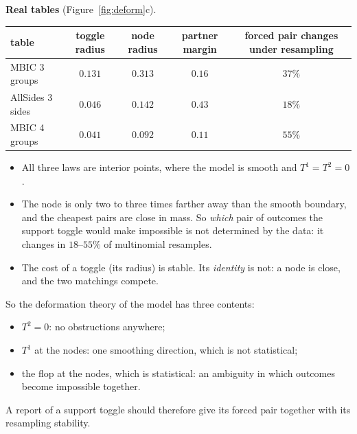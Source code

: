 \documentclass[11pt]{article}
\theoremstyle{definition}
\theoremstyle{remark}
\begin{document}
\textbf{Real tables} (Figure~\ref{fig:deform}c).
\begin{center}\small
\begin{tabular}{lcccc}
\toprule
table & toggle radius & node radius & partner margin & forced pair changes under resampling\\
\midrule
MBIC 3 groups & $0.131$ & $0.313$ & $0.16$ & $37\%$\\
AllSides 3 sides & $0.046$ & $0.142$ & $0.43$ & $18\%$\\
MBIC 4 groups & $0.041$ & $0.092$ & $0.11$ & $55\%$\\
\bottomrule
\end{tabular}
\end{center}
\begin{itemize}
  \item All three laws are interior points, where the model is smooth and $T^1=T^2=0$.
  \item The node is only two to three times farther away than the smooth boundary, and the cheapest pairs are close in mass. So \emph{which} pair of outcomes the support toggle would make impossible is not determined by the data: it changes in $18$--$55\%$ of multinomial resamples.
  \item The cost of a toggle (its radius) is stable. Its \emph{identity} is not: a node is close, and the two matchings compete.
\end{itemize}

\noindent So the deformation theory of the model has three contents:
\begin{itemize}
  \item $T^2=0$: no obstructions anywhere;
  \item $T^1$ at the nodes: one smoothing direction, which is not statistical;
  \item the flop at the nodes, which is statistical: an ambiguity in which outcomes become impossible together.
\end{itemize}
A report of a support toggle should therefore give its forced pair together with its resampling stability.
\end{document}
